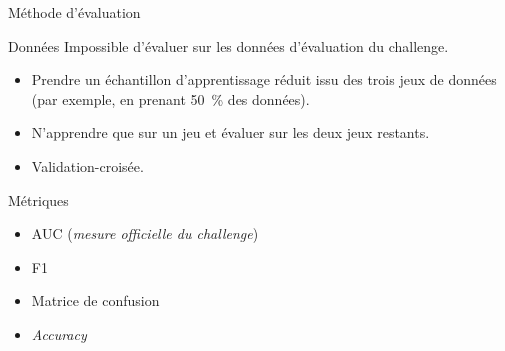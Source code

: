 \documentclass[compress,xcolor=table]{beamer}
\begin{document}
\begin{frame}{Méthode d'évaluation}

    \begin{exampleblock}{Données}
        Impossible d'évaluer sur les données d'évaluation du challenge.
        \begin{itemize}
            \item Prendre un échantillon d'apprentissage réduit issu des trois jeux de données (par exemple, en prenant 50~\% des données).
            \item N'apprendre que sur un jeu et évaluer sur les deux jeux restants.
            \item Validation-croisée.
        \end{itemize}
    \end{exampleblock}

    \begin{exampleblock}{Métriques}
        \begin{itemize}
            \item AUC (\textit{mesure officielle du challenge})
            \item F1
            \item Matrice de confusion
            \item \textit{Accuracy}
        \end{itemize}
    \end{exampleblock}

\end{frame}
\end{document}
